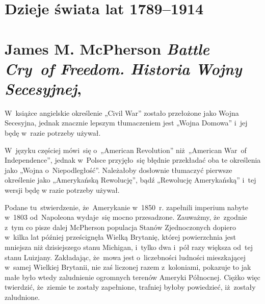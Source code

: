 \documentclass[a4paper,11pt]{article}
\numberwithin{equation}{section}
\begin{document}
\VerSpaceTwo












\newpage

\section{Dzieje świata lat 1789--1914}


\VerSpaceTwo



\newpage

\section{James M. McPherson \textit{Battle Cry~of Freedom.
    Historia Wojny Secesyjnej},
  \cite{McPhersonBattleCryOfFreedom2016}}

\vspace{0em}


\vspace{0em}


\noindent
W~książce angielskie określenie „Civil War” zostało przełożone jako Wojna
Secesyjna, jednak znacznie lepszym tłumaczeniem jest „Wojna Domowa” i~jej
będę w~razie potrzeby używał.

\VerSpaceFour





\noindent
W~języku częściej mówi~się o~„American Revolution” niż~„American War~of
Independence”, jednak w~Polsce przyjęło~się błędnie przekładać oba te
określenia jako „Wojna o~Niepodległość”. Należałoby dosłownie tłumaczyć
pierwsze określenie jako „Amerykańską Rewolucję”, bądź „Rewolucję
Amerykańską” i~tej wersji będę w razie potrzeby używał.

\VerSpaceFour







\noindent
{} Podane tu~stwierdzenie, że~Amerykanie w~1850~r.
zapełnili imperium nabyte w~1803 od~Napoleona wydaje~się mocno
przesadzone. Zauważmy, że~zgodnie z~tym co pisze dalej McPherson
populacja Stanów Zjednoczonych dopiero w~kilka lat później
prześcignęła Wielką Brytanię, której powierzchnia jest mniejsza niż
dzisiejszego stanu Michigan, i~tylko dwa i~pół razy większa od~tej
stanu Luizjany. Zakładając, że~mowa jest o~liczebności ludności
mieszkającej w~samej Wielkiej Brytanii, nie zaś liczonej razem
z~koloniami, pokazuje to jak małe było wtedy zaludnienie ogromnych
terenów Ameryki Północnej. Ciężko więc twierdzić, że~ziemie te zostały
zapełnione, trafniej byłoby powiedzieć, iż~zostały zaludnione.
\end{document}
